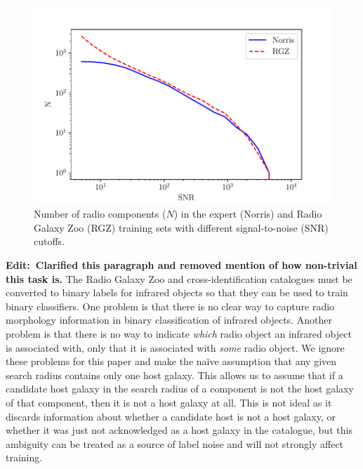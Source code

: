 \documentclass[fleqn,usenatbib,usedcolumn]{mnras}
\newcommand{\edit}[1]{{\bf Edit:~{#1}}}
\begin{document}
    \begin{figure}
      \centering
      \includegraphics[width=\columnwidth]{images/snr_cutoff_cumulative.pdf}
      \caption{Number of radio components ($N$) in the expert (Norris) and Radio Galaxy
        Zoo (RGZ) training sets with different signal-to-noise (SNR) cutoffs.}
      \label{fig:distribution-cutoffs}
    \end{figure}

    \edit{Clarified this paragraph and removed mention of how non-trivial this task is.} The Radio Galaxy Zoo and \citet{norris06} cross-identification catalogues must be converted to binary labels for infrared objects so that they can be used to train binary classifiers. One problem is that there is no clear way to capture radio morphology information in binary classification of infrared objects. Another problem is that there is no way to indicate \emph{which} radio object an infrared object is associated with, only that it is associated with \emph{some} radio object. We ignore these problems for this paper and make the na\"ive assumption that any given search radius contains only one host galaxy. This allows us to assume that if a candidate host galaxy in the search radius of a component is not the host galaxy of that component, then it is not a host galaxy at all. This is not ideal as it discards information about whether a candidate host is not a host galaxy, or whether it was just not acknowledged as a host galaxy in the catalogue, but this ambiguity can be treated as a source of label noise and will not strongly affect training.
\end{document}
